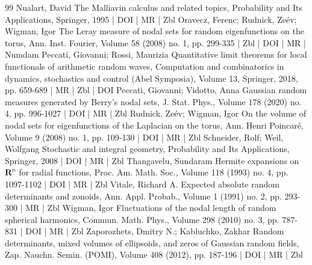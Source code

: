 \begin{thebibliography}{99}
 Nualart, David The Malliavin calculus and related topics, Probability and Its Applications, Springer, 1995 | DOI | MR | Zbl
 Oravecz, Ferenc; Rudnick, Zeév; Wigman, Igor The Leray measure of nodal sets for random eigenfunctions on the torus, Ann. Inst. Fourier, Volume 58 (2008) no. 1, pp. 299-335 | Zbl | DOI | MR | Numdam
 Peccati, Giovanni; Rossi, Maurizia Quantitative limit theorems for local functionals of arithmetic random waves, Computation and combinatorics in dynamics, stochastics and control (Abel Symposia), Volume 13, Springer, 2018, pp. 659-689 | MR | Zbl | DOI
 Peccati, Giovanni; Vidotto, Anna Gaussian random measures generated by Berry’s nodal sets, J. Stat. Phys., Volume 178 (2020) no. 4, pp. 996-1027 | DOI | MR | Zbl
 Rudnick, Zeév; Wigman, Igor On the volume of nodal sets for eigenfunctions of the Laplacian on the torus, Ann. Henri Poincaré, Volume 9 (2008) no. 1, pp. 109-130 | DOI | MR | Zbl
 Schneider, Rolf; Weil, Wolfgang Stochastic and integral geometry, Probability and Its Applications, Springer, 2008 | DOI | MR | Zbl
 Thangavelu, Sundaram Hermite expansions on ${\mathbf{R}}^n$ for radial functions, Proc. Am. Math. Soc., Volume 118 (1993) no. 4, pp. 1097-1102 | DOI | MR | Zbl
 Vitale, Richard A. Expected absolute random determinants and zonoids, Ann. Appl. Probab., Volume 1 (1991) no. 2, pp. 293-300 | MR | Zbl
 Wigman, Igor Fluctuations of the nodal length of random spherical harmonics, Commun. Math. Phys., Volume 298 (2010) no. 3, pp. 787-831 | DOI | MR | Zbl
 Zaporozhets, Dmitry N.; Kabluchko, Zakhar Random determinants, mixed volumes of ellipsoids, and zeros of Gaussian random fields, Zap. Nauchn. Semin. (POMI), Volume 408 (2012), pp. 187-196 | DOI | MR | Zbl
\end{thebibliography}
